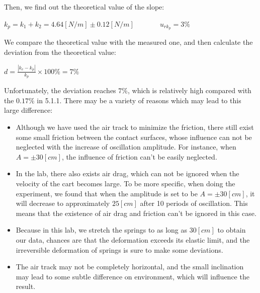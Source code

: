 \documentclass[a4paper,12pt]{article}
\begin{document}
\par Then, we find out the theoretical value of the slope:
\begin{center}
$k_p = k_1 + k_2 = 4.64 [N/m] \pm 0.12 [N/m] $ ~~~~~~ $ u_{rk_p} = 3\% $
\end{center}
\par We compare the theoretical value with the measured one, and then calculate the deviation from the theoretical value:
\begin{center}
$\displaystyle d = \frac{|k_v - k_p|}{k_p} \times 100\% = 7\% $
\end{center}
\par Unfortunately, the deviation reaches $7\%$, which is relatively high compared with the $0.17\%$ in 5.1.1. There may be a variety of reasons which may lead to this large difference:
\begin{itemize}
\item Although we have used the air track to minimize the friction, there still exist some small friction between the contact surfaces, whose influence can not be neglected with the increase of oscillation amplitude. For instance, when $A = \pm 30 [cm]$, the influence of friction can't be easily neglected.
\item In the lab, there also exists air drag, which can not be ignored when the velocity of the cart becomes large. To be more specific, when doing the experiment, we found that when the amplitude is set to be $A = \pm 30[cm]$, it will decrease to approximately $25[cm]$ after 10 periods of oscillation. This means that the existence of air drag and friction can't be ignored in this case.
\item Because in this lab, we stretch the springs to as long as $30 [cm]$ to obtain our data, chances are that the deformation exceeds its elastic limit, and the irreversible deformation of springs is sure to make some deviations.
\item The air track may not be completely horizontal, and the small inclination may lead to some subtle difference on environment, which will influence the result.
\end{itemize}
\end{document}
